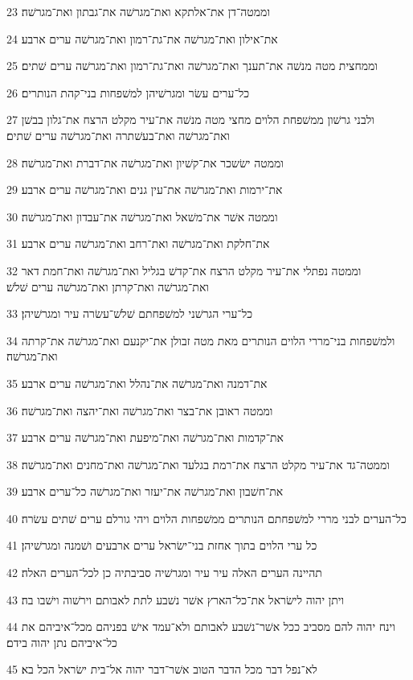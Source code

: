\par 23 וממטה־דן את־אלתקא ואת־מגרשׁה את־גבתון ואת־מגרשׁה׃
\par 24 את־אילון ואת־מגרשׁה את־גת־רמון ואת־מגרשׁה ערים ארבע׃
\par 25 וממחצית מטה מנשׁה את־תענך ואת־מגרשׁה ואת־גת־רמון ואת־מגרשׁה ערים שׁתים׃
\par 26 כל־ערים עשׂר ומגרשׁיהן למשׁפחות בני־קהת הנותרים׃
\par 27 ולבני גרשׁון ממשׁפחת הלוים מחצי מטה מנשׁה את־עיר מקלט הרצח את־גלון בבשׁן ואת־מגרשׁה ואת־בעשׁתרה ואת־מגרשׁה ערים שׁתים׃
\par 28 וממטה ישׂשכר את־קשׁיון ואת־מגרשׁה את־דברת ואת־מגרשׁה׃
\par 29 את־ירמות ואת־מגרשׁה את־עין גנים ואת־מגרשׁה ערים ארבע׃
\par 30 וממטה אשׁר את־משׁאל ואת־מגרשׁה את־עבדון ואת־מגרשׁה׃
\par 31 את־חלקת ואת־מגרשׁה ואת־רחב ואת־מגרשׁה ערים ארבע׃
\par 32 וממטה נפתלי את־עיר מקלט הרצח את־קדשׁ בגליל ואת־מגרשׁה ואת־חמת דאר ואת־מגרשׁה ואת־קרתן ואת־מגרשׁה ערים שׁלשׁ׃
\par 33 כל־ערי הגרשׁני למשׁפחתם שׁלשׁ־עשׂרה עיר ומגרשׁיהן׃
\par 34 ולמשׁפחות בני־מררי הלוים הנותרים מאת מטה זבולן את־יקנעם ואת־מגרשׁה את־קרתה ואת־מגרשׁה׃
\par 35 את־דמנה ואת־מגרשׁה את־נהלל ואת־מגרשׁה ערים ארבע׃
\par 36 וממטה ראובן את־בצר ואת־מגרשׁה ואת־יהצה ואת־מגרשׁה׃
\par 37 את־קדמות ואת־מגרשׁה ואת־מיפעת ואת־מגרשׁה ערים ארבע׃
\par 38 וממטה־גד את־עיר מקלט הרצח את־רמת בגלעד ואת־מגרשׁה ואת־מחנים ואת־מגרשׁה׃
\par 39 את־חשׁבון ואת־מגרשׁה את־יעזר ואת־מגרשׁה כל־ערים ארבע׃
\par 40 כל־הערים לבני מררי למשׁפחתם הנותרים ממשׁפחות הלוים ויהי גורלם ערים שׁתים עשׂרה׃
\par 41 כל ערי הלוים בתוך אחזת בני־ישׂראל ערים ארבעים ושׁמנה ומגרשׁיהן׃
\par 42 תהיינה הערים האלה עיר עיר ומגרשׁיה סביבתיה כן לכל־הערים האלה׃
\par 43 ויתן יהוה לישׂראל את־כל־הארץ אשׁר נשׁבע לתת לאבותם וירשׁוה וישׁבו בה׃
\par 44 וינח יהוה להם מסביב ככל אשׁר־נשׁבע לאבותם ולא־עמד אישׁ בפניהם מכל־איביהם את כל־איביהם נתן יהוה בידם׃
\par 45 לא־נפל דבר מכל הדבר הטוב אשׁר־דבר יהוה אל־בית ישׂראל הכל בא׃

